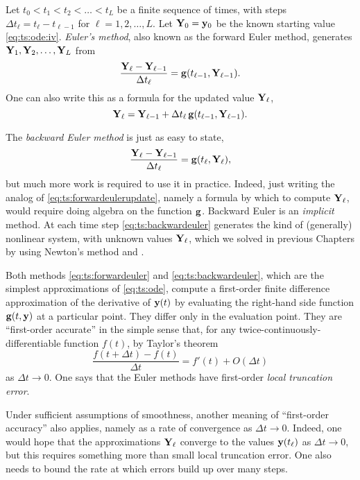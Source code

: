 Let $t_0<t_1<t_2<\dots<t_L$ be a finite sequence of times, with steps $\Delta t_\ell = t_\ell - t_{\ell-1}$ for $\ell=1,2,\dots,L$.  Let $\mathbf{Y}_0 = \mathbf{y}_0$ be the known starting value  \eqref{eq:ts:ode:iv}.  \emph{Euler's method}, also known as the forward Euler method, generates $\mathbf{Y}_1,\mathbf{Y}_2,\dots,\mathbf{Y}_L$ from
\begin{equation}
\frac{\mathbf{Y}_\ell - \mathbf{Y}_{\ell-1}}{\Delta t_\ell} = \mathbf{g}(t_{\ell-1},\mathbf{Y}_{\ell-1}). \label{eq:ts:forwardeuler}
\end{equation}
One can also write this as a formula for the updated value $\mathbf{Y}_\ell$,
\begin{equation}
\mathbf{Y}_\ell = \mathbf{Y}_{\ell-1} + \Delta t_\ell \, \mathbf{g}(t_{\ell-1},\mathbf{Y}_{\ell-1}). \label{eq:ts:forwardeulerupdate}
\end{equation}

The \emph{backward Euler method} is just as easy to state,
\begin{equation}
\frac{\mathbf{Y}_\ell - \mathbf{Y}_{\ell-1}}{\Delta t_\ell} = \mathbf{g}(t_{\ell},\mathbf{Y}_{\ell}),  \label{eq:ts:backwardeuler}
\end{equation}
but much more work is required to use it in practice.  Indeed, just writing the analog of \eqref{eq:ts:forwardeulerupdate}, namely a formula by which to compute $\mathbf{Y}_\ell$, would require doing algebra on the function $\mathbf{g}$.  Backward Euler is an \emph{implicit} method.  At each time step \eqref{eq:ts:backwardeuler} generates the kind of (generally) nonlinear system, with unknown values $\mathbf{Y}_\ell$, which we solved in previous Chapters by using Newton's method and \pSNES.

Both methods \eqref{eq:ts:forwardeuler} and \eqref{eq:ts:backwardeuler}, which are the simplest approximations of \eqref{eq:ts:ode}, compute a first-order finite difference approximation of the derivative of $\mathbf{y}(t)$ by evaluating the right-hand side function $\mathbf{g}(t,\mathbf{y})$ at a particular point.  They differ only in the evaluation point.  They are ``first-order accurate'' in the simple sense that, for any twice-continuously-differentiable function $f(t)$, by Taylor's theorem
    $$\frac{f(t+\Delta t) - f(t)}{\Delta t} = f'(t) + O(\Delta t)$$
as $\Delta t \to 0$.  One says that the Euler methods have first-order \emph{local truncation error}.

Under sufficient assumptions of smoothness, another meaning of ``first-order accuracy'' also applies, namely as a rate of convergence as $\Delta t\to 0$.  Indeed, one would hope that the approximations $\mathbf{Y}_\ell$ converge to the values $\mathbf{y}(t_\ell)$ as $\Delta t\to 0$, but this requires something more than small local truncation error.  One also needs to bound the rate at which errors build up over many steps.


